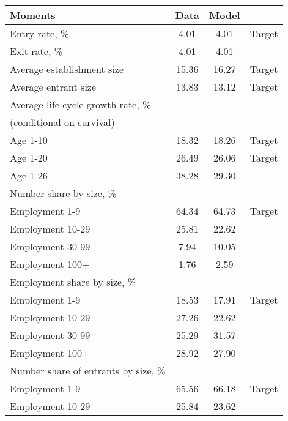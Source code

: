 \begin{tabular}{lccc}
\toprule
Moments & Data & Model &  \\
\midrule
Entry rate, \% & 4.01 & 4.01 & Target \\
Exit rate, \% & 4.01 & 4.01 &  \\
Average establishment size & 15.36 & 16.27 & Target \\
Average entrant size & 13.83 & 13.12 & Target \\
Average life-cycle growth rate, \% &   &   &  \\
(conditional on survival) &   &   &  \\
\hspace{10mm}Age 1-10 & 18.32 & 18.26 & Target \\
\hspace{10mm}Age 1-20 & 26.49 & 26.06 & Target \\
\hspace{10mm}Age 1-26 & 38.28 & 29.30 &  \\
Number share by size, \% &   &   &  \\
\hspace{10mm}Employment 1-9 & 64.34 & 64.73 & Target \\
\hspace{10mm}Employment 10-29 & 25.81 & 22.62 &  \\
\hspace{10mm}Employment 30-99 & 7.94 & 10.05 &  \\
\hspace{10mm}Employment 100+ & 1.76 & 2.59 &  \\
Employment share by size, \% &   &   &  \\
\hspace{10mm}Employment 1-9 & 18.53 & 17.91 & Target \\
\hspace{10mm}Employment 10-29 & 27.26 & 22.62 &  \\
\hspace{10mm}Employment 30-99 & 25.29 & 31.57 &  \\
\hspace{10mm}Employment 100+ & 28.92 & 27.90 &  \\
Number share of entrants by size, \% &   &   &  \\
\hspace{10mm}Employment 1-9 & 65.56 & 66.18 & Target \\
\hspace{10mm}Employment 10-29 & 25.84 & 23.62 &  \\

\end{tabular}
